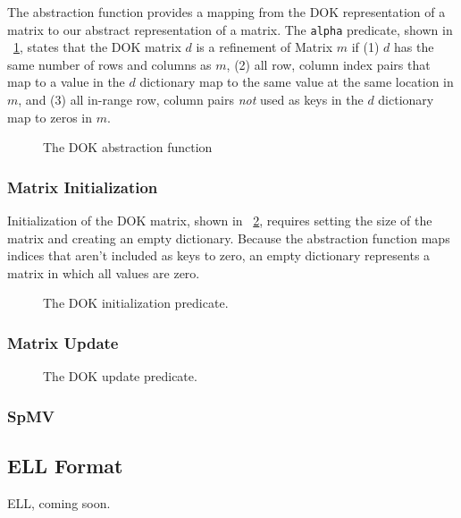 \documentclass[11pt,conference]{IEEEtran}
\begin{document}
The abstraction function provides a mapping from the DOK representation of a matrix to our abstract representation of a matrix.  The \texttt{alpha} predicate, shown in \figurename~\ref{alpha:dok}, states that the DOK matrix $d$ is a refinement of Matrix $m$ if (1) $d$ has the same number of rows and columns as $m$, (2) all row, column index pairs that map to a value in the $d$ dictionary map to the same value at the same location in $m$, and (3) all in-range row, column pairs \emph{not} used as keys in the $d$ dictionary map to zeros in $m$.

\begin{figure}
\centering

\caption{The DOK abstraction function}
\label{alpha:dok}
\end{figure}

\subsubsection{Matrix Initialization}

Initialization of the DOK matrix, shown in \figurename~\ref{init:dok}, requires setting the size of the matrix and creating an empty dictionary.  Because the abstraction function maps indices that aren't included as keys to zero, an empty dictionary represents a matrix in which all values are zero.

\begin{figure}
\centering

\caption{The DOK initialization predicate.}
\label{init:dok}
\end{figure}

\subsubsection{Matrix Update}

\begin{figure}
\centering

\caption{The DOK update predicate.}
\label{update:dok}
\end{figure}

\subsubsection{SpMV}

\subsection{ELL Format}

ELL, coming soon.
\end{document}

